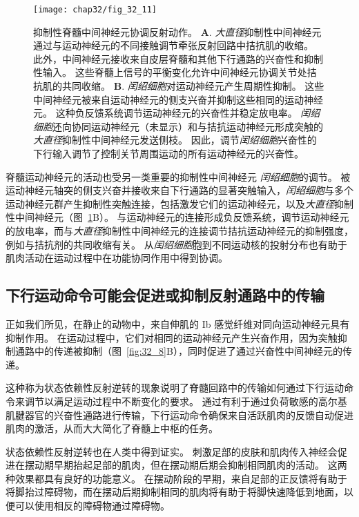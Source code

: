 \begin{figure}[htbp]
	\centering
	\texttt{[image: chap32/fig\_32\_11]}
	\caption{抑制性脊髓中间神经元协调反射动作。
	\textbf{A}. \textit{大直径}抑制性中间神经元通过与运动神经元的不同接触调节牵张反射回路中拮抗肌的收缩。
	此外，中间神经元接收来自皮层脊髓和其他下行通路的兴奋性和抑制性输入。
	这些脊髓上信号的平衡变化允许中间神经元协调关节处拮抗肌的共同收缩。
	\textbf{B}. \textit{闰绍细胞}对运动神经元产生周期性抑制。
	这些中间神经元被来自运动神经元的侧支兴奋并抑制这些相同的运动神经元。
	这种负反馈系统调节运动神经元的兴奋性并稳定放电率。
	\textit{闰绍细胞}还向协同运动神经元（未显示）和与拮抗运动神经元形成突触的\textit{大直径}抑制性中间神经元发送侧枝。
	因此，调节\textit{闰绍细胞}兴奋性的下行输入调节了控制关节周围运动的所有运动神经元的兴奋性。}
	\label{fig:32_11}
\end{figure}


脊髓运动神经元的活动也受另一类重要的抑制性中间神经元 \textit{闰绍细胞}的调节。
被运动神经元轴突的侧支兴奋并接收来自下行通路的显著突触输入，\textit{闰绍细胞}与多个运动神经元群产生抑制性突触连接，包括激发它们的运动神经元，以及\textit{大直径}抑制性中间神经元（图~\ref{fig:32_11}B）。
与运动神经元的连接形成负反馈系统，调节运动神经元的放电率，而与\textit{大直径}抑制性中间神经元的连接调节拮抗运动神经元的抑制强度，例如与拮抗剂的共同收缩有关。
从\textit{闰绍细胞}胞到不同运动核的投射分布也有助于肌肉活动在运动过程中在功能协同作用中得到协调。



\subsection{下行运动命令可能会促进或抑制反射通路中的传输}

正如我们所见，在静止的动物中，来自伸肌的 Ib 感觉纤维对同向运动神经元具有抑制作用。
在运动过程中，它们对相同的运动神经元产生兴奋作用，因为突触抑制通路中的传递被抑制（图~\ref{fig:32_8}B），同时促进了通过兴奋性中间神经元的传递。


这种称为状态依赖性反射逆转的现象说明了脊髓回路中的传输如何通过下行运动命令来调节以满足运动过程中不断变化的要求。
通过有利于通过负荷敏感的高尔基肌腱器官的兴奋性通路进行传输，下行运动命令确保来自活跃肌肉的反馈自动促进肌肉的激活，从而大大简化了脊髓上中枢的任务。


状态依赖性反射逆转也在人类中得到证实。
刺激足部的皮肤和肌肉传入神经会促进在摆动期早期抬起足部的肌肉，但在摆动期后期会抑制相同肌肉的活动。
这两种效果都具有良好的功能意义。
在摆动阶段的早期，来自足部的正反馈将有助于将脚抬过障碍物，而在摆动后期抑制相同的肌肉将有助于将脚快速降低到地面，以便可以使用相反的障碍物通过障碍物。



